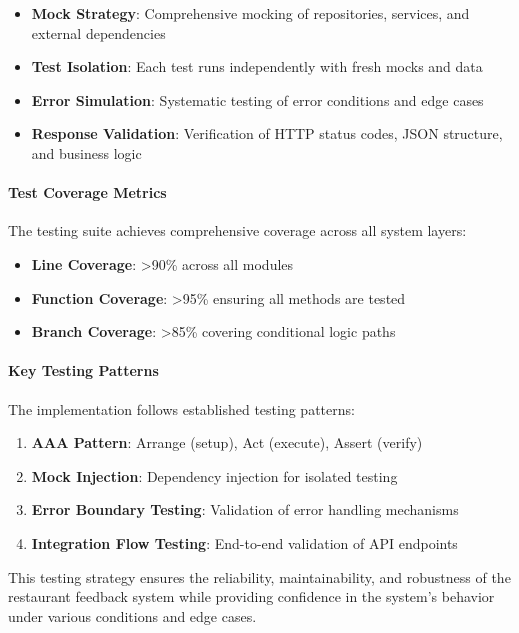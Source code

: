 \begin{itemize}
    \item \textbf{Mock Strategy}: Comprehensive mocking of repositories, services, and external dependencies
    \item \textbf{Test Isolation}: Each test runs independently with fresh mocks and data
    \item \textbf{Error Simulation}: Systematic testing of error conditions and edge cases
    \item \textbf{Response Validation}: Verification of HTTP status codes, JSON structure, and business logic
\end{itemize}

\paragraph{Test Coverage Metrics}
The testing suite achieves comprehensive coverage across all system layers:

\begin{itemize}
    \item \textbf{Line Coverage}: >90\% across all modules
    \item \textbf{Function Coverage}: >95\% ensuring all methods are tested
    \item \textbf{Branch Coverage}: >85\% covering conditional logic paths
\end{itemize}

\paragraph{Key Testing Patterns}
The implementation follows established testing patterns:

\begin{enumerate}
    \item \textbf{AAA Pattern}: Arrange (setup), Act (execute), Assert (verify)
    \item \textbf{Mock Injection}: Dependency injection for isolated testing
    \item \textbf{Error Boundary Testing}: Validation of error handling mechanisms
    \item \textbf{Integration Flow Testing}: End-to-end validation of API endpoints
\end{enumerate}

This testing strategy ensures the reliability, maintainability, and robustness of the restaurant feedback system while providing confidence in the system's behavior under various conditions and edge cases. 